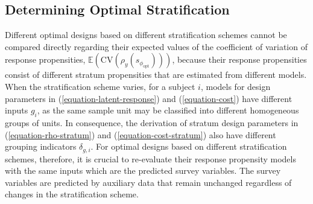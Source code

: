 \documentclass[12pt]{article}
\begin{document}









\subsection{Determining Optimal Stratification}
\label{subsec:determining-optimal-stratification}

Different optimal designs based on different stratification schemes cannot be compared directly regarding their expected values of the coefficient of variation of response propensities, $\mathbb{E}\left(\mathrm{CV}(\rho_y(s_{\phi_{\mathrm{opt}}}))\right)$, because their response propensities consist of different stratum propensities that are estimated from different models.
When the stratification scheme varies, for a subject $i$, models for design parameters in (\ref{equation-latent-response}) and (\ref{equation-cost}) have different inputs $g_i$, as the same sample unit may be classified into different homogeneous groups of units.
In consequence, the derivation of stratum design parameters in (\ref{equation-rho-stratum}) and (\ref{equation-cost-stratum}) also have different grouping indicators $\delta_{g,i}$.
For optimal designs based on different stratification schemes, therefore, it is crucial to re-evaluate their response propensity models with the same inputs which are the predicted survey variables.
The survey variables are predicted by auxiliary data that remain unchanged regardless of changes in the stratification scheme.
\end{document}
